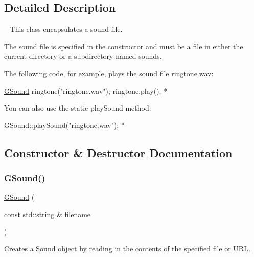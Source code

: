 \subsection{Detailed Description}
~\newline
 This class encapsulates a sound file. 

The sound file is specified in the constructor and must be a file in either the current directory or a subdirectory named {\ttfamily sounds}.

The following code, for example, plays the sound file {\ttfamily ringtone.\+wav}\+:


\begin{DoxyPre}
     \mbox{\hyperlink{classsgl_1_1GSound}{GSound}} ringtone("ringtone.wav");
     ringtone.play();
*\end{DoxyPre}


You can also use the static {\ttfamily play\+Sound} method\+:


\begin{DoxyPre}
     \mbox{\hyperlink{classsgl_1_1GSound_a33b24517799bad56a19cfe26b3f962ae}{GSound::playSound}}("ringtone.wav");
*\end{DoxyPre}
 

\subsection{Constructor \& Destructor Documentation}
\mbox{\label{classsgl_1_1GSound_a981dcd44480101dbeb769d9fb93ef9b2}} 
\subsubsection{\texorpdfstring{G\+Sound()}{GSound()}}
{\footnotesize\ttfamily \mbox{\hyperlink{classsgl_1_1GSound}{G\+Sound}} (\begin{DoxyParamCaption}\item[{const std\+::string \&}]{filename }\end{DoxyParamCaption})}



Creates a {\ttfamily Sound} object by reading in the contents of the specified file or U\+RL. 

\mbox{\label{classsgl_1_1GSound_a417fb21fbcfa4b731a58854dd4005da7}} 
